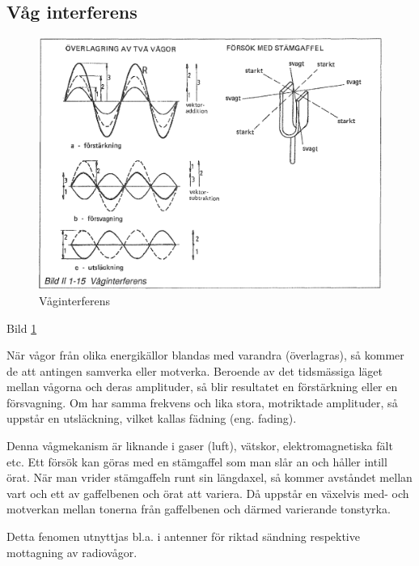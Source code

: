 \subsection{Våg interferens}

\begin{figure}
  \includegraphics[width=\textwidth]{images/bild_2_1-15}
  \caption{Våginterferens}
  \label{fig:BildII1-15}
\end{figure}

Bild \ref{fig:BildII1-15}

När vågor från olika energikällor blandas med varandra (överlagras), så kommer
de att antingen samverka eller motverka. Beroende av det tidsmässiga läget
mellan vågorna och deras amplituder, så blir resultatet en förstärkning eller
en försvagning. Om har samma frekvens och lika stora, motriktade amplituder, så
uppstår en utsläckning, vilket kallas fädning (eng. fading).

Denna vågmekanism är liknande i gaser (luft), vätskor, elektromagnetiska fält
etc. Ett försök kan göras med en stämgaffel som man slår an och håller intill
örat. När man vrider stämgaffeln runt sin längdaxel, så kommer avståndet mellan
vart och ett av gaffelbenen och örat att variera. Då uppstår en växelvis med-
och motverkan mellan tonerna från gaffelbenen och därmed varierande tonstyrka.

Detta fenomen utnyttjas bl.a. i antenner för riktad sändning respektive
mottagning av radiovågor.
